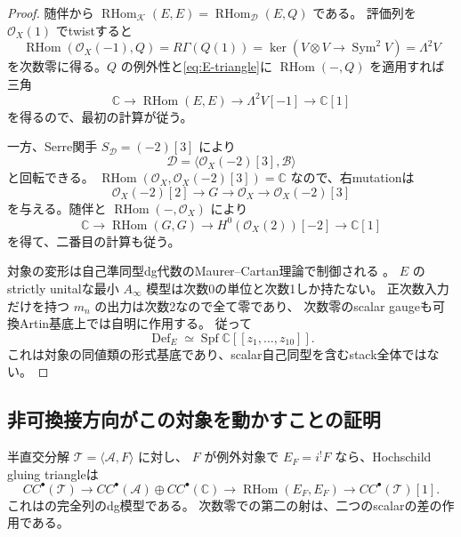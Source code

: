 \documentclass[a4paper,11pt]{ltjsarticle}
\theoremstyle{definition}
\newcommand{\CC}{\mathbb C}
\newcommand{\OO}{\mathcal O}
\newcommand{\Spf}{\operatorname{Spf}}
\newcommand{\Def}{\operatorname{Def}}
\newcommand{\Sym}{\operatorname{Sym}}
\newcommand{\RHom}{\operatorname{RHom}}
\begin{document}
\begin{proof}
随伴から $\RHom_{\mathcal K}(E,E)=\RHom_{\mathcal D}(E,Q)$ である。
評価列を $\OO_X(1)$ でtwistすると
\[
 \RHom(\OO_X(-1),Q)=R\Gamma(Q(1))
 =\ker(V\otimes V\to\Sym^2V)=\Lambda^2V
\]
を次数零に得る。$Q$ の例外性と\eqref{eq:E-triangle}に
$\RHom(-,Q)$ を適用すれば三角
\[
 \CC\longrightarrow\RHom(E,E)\longrightarrow
 \Lambda^2V[-1]\longrightarrow\CC[1]
\]
を得るので、最初の計算が従う。

一方、Serre関手 $S_{\mathcal D}=(-2)[3]$ により
\[
 \mathcal D=\langle\OO_X(-2)[3],\mathcal B\rangle
\]
と回転できる。
$\RHom(\OO_X,\OO_X(-2)[3])=\CC$ なので、右mutationは
\[
 \OO_X(-2)[2]\longrightarrow G\longrightarrow\OO_X
 \longrightarrow\OO_X(-2)[3] \tag{G}\label{eq:G-triangle}
\]
を与える。随伴と $\RHom(-,\OO_X)$ により
\[
 \CC\longrightarrow\RHom(G,G)\longrightarrow
 H^0(\OO_X(2))[-2]\longrightarrow\CC[1]
\]
を得て、二番目の計算も従う。

対象の変形は自己準同型dg代数のMaurer--Cartan理論で制御される
\cite[Proposition 6.1]{ELOI}\cite[Theorems 7.2, 11.8]{ELOII}。
$E$ のstrictly unitalな最小 $A_\infty$ 模型は次数0の単位と次数1しか持たない。
正次数入力だけを持つ $m_n$ の出力は次数2なので全て零であり、
次数零のscalar gaugeも可換Artin基底上では自明に作用する。
従って
\[
 \Def_E\simeq\Spf\CC[[z_1,\ldots,z_{10}]].
\]
これは対象の同値類の形式基底であり、scalar自己同型を含むstack全体ではない。
\end{proof}

\subsection{非可換接方向がこの対象を動かすことの証明}

半直交分解 $\mathcal T=\langle\mathcal A,F\rangle$ に対し、
$F$ が例外対象で $E_F=i^!F$ なら、Hochschild gluing triangleは
\begin{equation}\label{eq:gluing-triangle}
 CC^\bullet(\mathcal T)\longrightarrow
 CC^\bullet(\mathcal A)\oplus CC^\bullet(\CC)
 \longrightarrow\RHom(E_F,E_F)
 \longrightarrow CC^\bullet(\mathcal T)[1].
\end{equation}
これは\cite[Theorem 7.7, Remark 7.8]{Kuz}の完全列のdg模型である。
次数零での第二の射は、二つのscalarの差の作用である。
\end{document}
